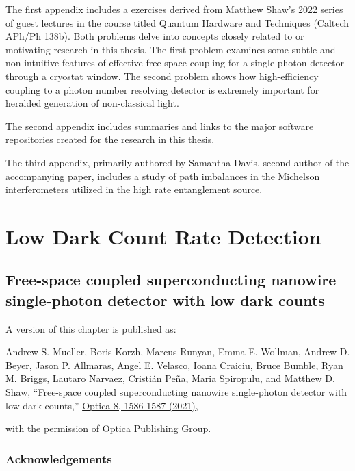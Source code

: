 \documentclass[11pt]{caltech_thesis} %
\begin{document}
The first appendix includes a ezercises derived from Matthew Shaw's 2022 series of guest lectures in the course titled Quantum Hardware and Techniques (Caltech APh/Ph 138b). Both problems delve into concepts closely related to or motivating research in this thesis. The first problem examines some subtle and non-intuitive features of effective free space coupling for a single photon detector through a cryostat window. The second problem shows how high-efficiency coupling to a photon number resolving detector is extremely important for heralded generation of non-classical light.

The second appendix includes summaries and links to the major software repositories created for the research in this thesis.

The third appendix, primarily authored by Samantha Davis, second author of the accompanying paper, includes a study of path imbalances in the Michelson interferometers utilized in the high rate entanglement source.

\hypertarget{low-dark-count-rate-detection}{%
\chapter{Low Dark Count Rate Detection}\label{low-dark-count-rate-detection}}

\hypertarget{free-space-coupled-superconducting-nanowire-single-photon-detector-with-low-dark-counts}{%
\section{Free-space coupled superconducting nanowire single-photon detector with low dark counts}\label{free-space-coupled-superconducting-nanowire-single-photon-detector-with-low-dark-counts}}

A version of this chapter is published as:

Andrew S. Mueller, Boris Korzh, Marcus Runyan, Emma E. Wollman, Andrew D. Beyer, Jason P. Allmaras, Angel E. Velasco, Ioana Craiciu, Bruce Bumble, Ryan M. Briggs, Lautaro Narvaez, Cristián Peña, Maria Spiropulu, and Matthew D. Shaw, ``Free-space coupled superconducting nanowire single-photon detector with low dark counts,'' \href{https://opg.optica.org/optica/fulltext.cfm?uri=optica-8-12-1586\&id=465726}{Optica 8, 1586-1587 (2021)},

with the permission of Optica Publishing Group.

\hypertarget{acknowledgements}{%
\subsection{Acknowledgements}\label{acknowledgements}}
\end{document}
